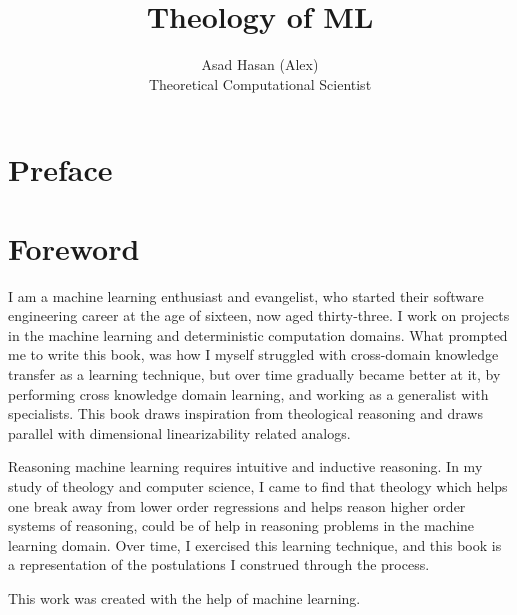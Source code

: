 \documentclass[ebook,12pt,oneside,openany]{memoir}
\title{Theology of ML}
\author{Asad Hasan (Alex) \\ Theoretical Computational Scientist}
\begin{document}
\makeatletter
\renewcommand{\@date}{} %
\makeatother
\maketitle
\chapter*{Preface}


\vspace*{\fill} %


\vspace*{\fill} %


\chapter*{Foreword}


\indent \indent I am a machine learning enthusiast and evangelist, who started their software engineering career at the age of sixteen, now aged thirty-three. I work on projects in the machine learning and deterministic computation domains. What prompted me to write this book, was how I myself struggled with cross-domain knowledge transfer as a learning technique, but over time gradually became better at it, by performing cross knowledge domain learning, and working as a generalist with specialists. This book draws inspiration from theological reasoning and draws parallel with dimensional linearizability related analogs.

\indent Reasoning machine learning requires intuitive and inductive reasoning. In my study of theology and computer science, I came to find that theology which helps one break away from lower order regressions and helps reason higher order systems of reasoning, could be of help in reasoning problems in the machine learning domain. Over time, I exercised this learning technique, and this book is a representation of the postulations I construed through the process.

\indent This work was created with the help of machine learning.
\end{document}
